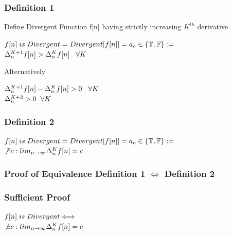 \documentclass[11pt]{article}
\begin{document}
\subsubsection{Definition 1}
Define Divergent Function f[n] having strictly increasing $K^{th}$ derivative
\vspace{1mm}
\begin{center}
$
f[n]\hspace{1mm} is \hspace{1mm} Divergent = Divergent[f[n]] = a_o \in \{\mathbb{T},\mathbb{F}\} :=
$
\\ \vspace{4mm}
$
\Delta_n^{K+1} f[n] > \Delta_n^{K}f[n] \hspace{3mm} \forall K
$
\end{center}
Alternatively
\begin{center}
$
\Delta_n^{K+1} f[n] - \Delta_n^{K}f[n] > 0 \hspace{3mm} \forall K
$
\\ \vspace{4mm}
$
\Delta_{n}^{K+2} > 0 \hspace{2mm} \forall K
$
\end{center}

\subsubsection{Definition 2}
\begin{center}
\vspace{2mm}
$
f[n]\hspace{1mm} is \hspace{1mm} Divergent = Divergent[f[n]] = a_o \in \{\mathbb{T},\mathbb{F}\} :=
$
\\ \vspace{4mm}
$
\not \exists c: lim_{n\rightarrow \infty} \Delta_n^K f[n] = c
$
\end{center}

\subsubsection{Proof of Equivalence Definition 1 $\Leftrightarrow$ Definition 2}

\subsubsection{Sufficient Proof}
\begin{center}
\vspace{2mm}
$
f[n]\hspace{1mm} is \hspace{1mm} Divergent \Longleftrightarrow
$
\\ \vspace{4mm}
$
\not \exists c: lim_{n\rightarrow \infty} \Delta_n^K f[n] = c
$
\end{center}
\end{document}
